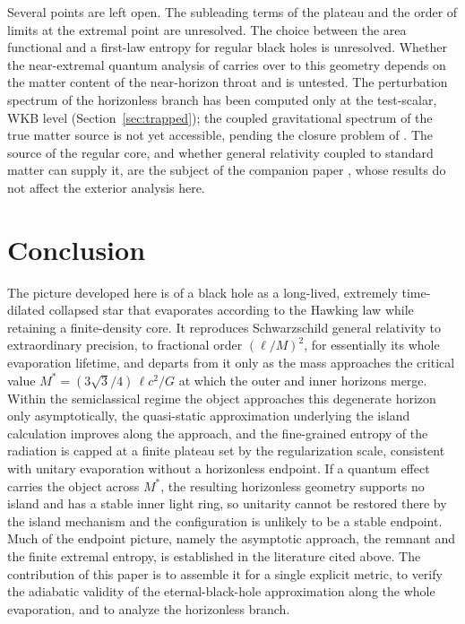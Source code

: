 \documentclass[11pt]{article}
\begin{document}
Several points are left open. The subleading terms of the plateau and the order of limits at the extremal point are unresolved. The choice between the area functional and a first-law entropy for regular black holes is unresolved. Whether the near-extremal quantum analysis of \citet{Brown2026} carries over to this geometry depends on the matter content of the near-horizon throat and is untested. The perturbation spectrum of the horizonless branch has been computed only at the test-scalar, WKB level (Section~\ref{sec:trapped}); the coupled gravitational spectrum of the true matter source is not yet accessible, pending the closure problem of \citet{PaperB}. The source of the regular core, and whether general relativity coupled to standard matter can supply it, are the subject of the companion paper \citep{PaperB}, whose results do not affect the exterior analysis here.

\section{Conclusion}

The picture developed here is of a black hole as a long-lived, extremely time-dilated collapsed star that evaporates according to the Hawking law while retaining a finite-density core. It reproduces Schwarzschild general relativity to extraordinary precision, to fractional order $(\ell/M)^2$, for essentially its whole evaporation lifetime, and departs from it only as the mass approaches the critical value $M^*=(3\sqrt3/4)\,\ell c^2/G$ at which the outer and inner horizons merge. Within the semiclassical regime the object approaches this degenerate horizon only asymptotically, the quasi-static approximation underlying the island calculation improves along the approach, and the fine-grained entropy of the radiation is capped at a finite plateau set by the regularization scale, consistent with unitary evaporation without a horizonless endpoint. If a quantum effect carries the object across $M^*$, the resulting horizonless geometry supports no island and has a stable inner light ring, so unitarity cannot be restored there by the island mechanism and the configuration is unlikely to be a stable endpoint. Much of the endpoint picture, namely the asymptotic approach, the remnant and the finite extremal entropy, is established in the literature cited above. The contribution of this paper is to assemble it for a single explicit metric, to verify the adiabatic validity of the eternal-black-hole approximation along the whole evaporation, and to analyze the horizonless branch.
\end{document}
